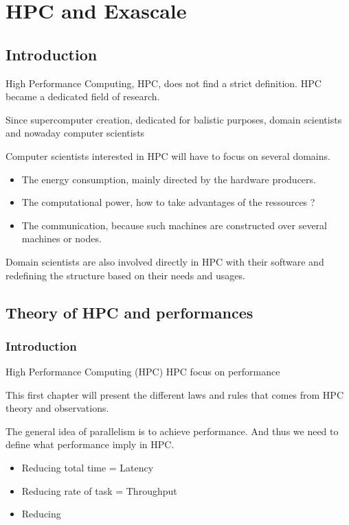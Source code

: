 \part{HPC and Exascale}
\chapter*{Introduction}

High Performance Computing, HPC, does not find a strict definition. 
HPC became a dedicated field of research. 

Since supercomputer creation, dedicated for balistic purposes, domain scientists and nowaday computer scientists

Computer scientists interested in HPC will have to focus on several domains. 
\begin{itemize}
\item The energy consumption, mainly directed by the hardware producers. 
\item The computational power, how to take advantages of the ressources ? 
\item The communication, because such machines are constructed over several machines or nodes. 
\end{itemize}

Domain scientists are also involved directly in HPC with their software and redefining the structure based on their needs and usages. 



\chapter{Theory of HPC and performances}

\section{Introduction}
High Performance Computing (HPC)
HPC focus on performance 

This first chapter will present the different laws and rules that comes from HPC theory and observations. 

The general idea of parallelism is to achieve performance. 
And thus we need to define what performance imply in HPC. 
\begin{itemize}
\item Reducing total time = Latency 
\item Reducing rate of task = Throughput 
\item Reducing  
\end{itemize}

